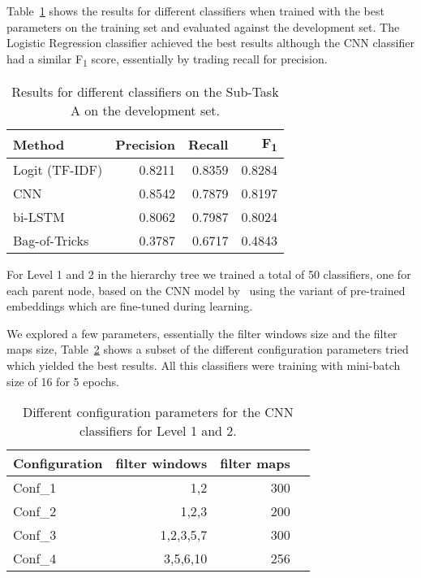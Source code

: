 \documentclass[11pt,a4paper]{article}
\begin{document}
Table~\ref{subtask_a_devset-results} shows the results for different classifiers
when trained with the best parameters on the training set and evaluated against
the development set. The Logistic Regression classifier achieved the best results
although the CNN classifier  had a similar F\textsubscript{1} score, essentially
by trading recall for precision.

\begin{table}[!h]
\begin{center}
\begin{tabular}{|l|r|r|r|}
\hline\centering\textbf{Method}  & \textbf{Precision} &  \textbf{Recall} &  \textbf{F\textsubscript{1}}\\
\hline
 Logit (TF-IDF) & 0.8211 & 0.8359 & 0.8284 \\
 CNN            & 0.8542 & 0.7879 & 0.8197 \\
 bi-LSTM        & 0.8062 & 0.7987 & 0.8024 \\
 Bag-of-Tricks  & 0.3787 & 0.6717 & 0.4843 \\
\hline
\end{tabular}
\end{center}
\caption{\label{subtask_a_devset-results} Results for different classifiers on the Sub-Task A on the development set.}
\end{table}

For Level 1 and 2 in the hierarchy tree we trained a total of 50 classifiers, one
for each parent node, based on the CNN model by~\citet{kim-2014-convolutional}
using the variant of pre-trained embeddings which are fine-tuned during learning.

We explored a few parameters, essentially the filter windows size and the filter
maps size, Table~\ref{subtask_b_parameters} shows a subset of the different
configuration parameters tried which yielded the best results. All this classifiers
 were training with mini-batch size of 16 for 5 epochs.

\begin{table}[!h]
\begin{center}
\begin{tabular}{|l|r|r|r|}
\hline\centering\textbf{Configuration}  & \textbf{filter windows} &  \textbf{filter maps} \\
\hline
 Conf\_1 & 1,2       & 300 \\
 Conf\_2 & 1,2,3     & 200 \\
 Conf\_3 & 1,2,3,5,7 & 300 \\
 Conf\_4 & 3,5,6,10  & 256 \\
\hline
\end{tabular}
\end{center}
\caption{\label{subtask_b_parameters} Different configuration parameters for the CNN classifiers for Level 1 and 2.}
\end{table}
\end{document}
